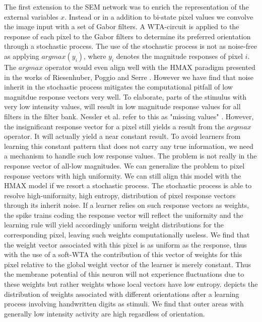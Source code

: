 \documentclass{report}
\begin{document}
The first extension to the SEM network was to enrich the representation of the external variables $x$. Instead or in a addition to bi-state pixel values we convolve the image input with a set of Gabor filters. A WTA-circuit is applied to the response of each pixel to the Gabor filters to determine its preferred orientation through a stochastic process. The use of the stochastic process is not as noise-free as applying $argmax(y_i)$, where $y_i$ denotes the magnitude responses of pixel $i$. The $argmax$ operator would even align well with the HMAX paradigm presented in the works of Riesenhuber, Poggio and Serre \cite{Riesenhuber1999, Riesenhuber2000, Serre04realisticmodeling, Serre}. However we have find that noise inherit in the stochastic process mitigates the computational pitfall of low magnitdue response vectors very well. To elaborate, parts of the stimulus with very low intensity values, will result in low magnitude response values for all filters in the filter bank. Nessler et al. refer to this as "missing values" \cite{Nessler2013}. However, the insignificant response vector for a pixel still yields a result from the $argmax$ operator. It will actually yield a near constant result. To avoid learners from learning this constant pattern that does not carry any true information, we need a mechanism to handle such low response values. The problem is not really in the response vector of all-low magnitudes. We can generalize the problem to pixel response vectors with high uniformity. We can still align this model with the HMAX model if we resort a stochastic process. The stochastic process is able to resolve high-uniformity, high entropy, distribution of pixel response vectors through its inherit noise. If a learner relies on such response vectors as weights, the spike trains coding the response vector will reflect the uniformity and the learning rule will yield accordingly uniform weight distributions for the corresponding pixel, leaving such weights computationally useless. We find that the weight vector associated with this pixel is as uniform as the response, thus with the use of a soft-WTA the contribution of this vector of weights for this pixel relative to the global weight vector of the learner is merely constant. Thus the membrane potential of this neuron will not experience fluctuations due to these weights but rather weights whose local vectors have low entropy.  depicts the distribution of weights associated with different orientations after a learning process involving handwritten digits as stimuli. We find that outer areas with generally low intensity activity are high regardless of orientation.
\end{document}

